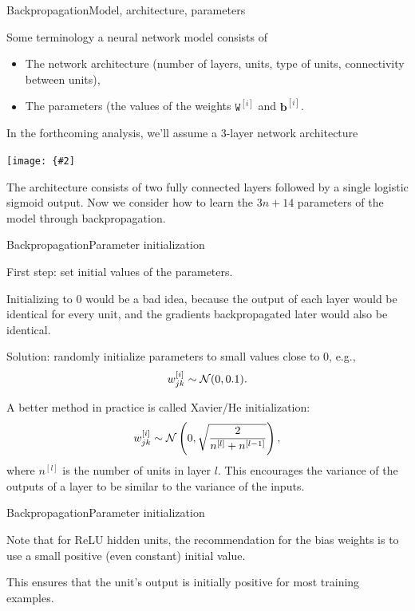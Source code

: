 \documentclass{beamer}
\renewcommand{\vec}[1]{\boldsymbol{#1}}
\newcommand{\mat}[1]{\mathtt{#1}}
\newcommand{\myfig}[3]{\centerline{\texttt{[image: \{\#2]}}}
\begin{document}
\begin{frame}{Backpropagation}{Model, architecture, parameters}

  Some terminology a neural network \alert{model} consists of
  \begin{itemize}
  \item The network \alert{architecture} (number of layers, units, type of units, connectivity between units),
  \item The \alert{parameters} (the values of the weights $\mat{W}^{[i]}$ and
    $\vec{b}^{[i]}$.
  \end{itemize}

  \medskip

  In the forthcoming analysis, we'll assume a 3-layer network architecture

  \myfig{2.5in}{three-layer}{Ng (2017), Deep learning lecture notes for CS 229.}

  The architecture consists of two \alert{fully connected layers}
  followed by a single \alert{logistic sigmoid output}. Now we
  consider how to learn the $3n+14$ parameters of the model through
  backpropagation.

\end{frame}


\begin{frame}{Backpropagation}{Parameter initialization}

  First step: \alert{set initial values of the parameters}.

  \medskip

  Initializing to 0 would be a bad idea, because the output of each layer
  would be identical for every unit, and the gradients backpropagated
  later would also be identical.

  \medskip

  Solution: randomly initialize parameters to small values close to 0,
  e.g., \[ w^{[i]}_{jk} \sim {\cal N}(0,0.1). \]

  A better method in practice is called Xavier/He initialization:
  \[ w^{[i]}_{jk} \sim {\cal N}\left(0,\sqrt{\frac{2}{n^{[l]}+n^{[l-1]}}} \right), \]
  where $n^{[l]}$ is the number of units in layer $l$. This encourages
  the variance of the outputs of a layer to be similar to the variance
  of the inputs.
  
\end{frame}


\begin{frame}{Backpropagation}{Parameter initialization}

  Note that for \alert{ReLU hidden units}, the recommendation for the
  \alert{bias weights} is to use a small \alert{positive} (even
  constant) initial value.

  \medskip

  This ensures that the unit's output is initially positive for most
  training examples.
  
\end{frame}
\end{document}
